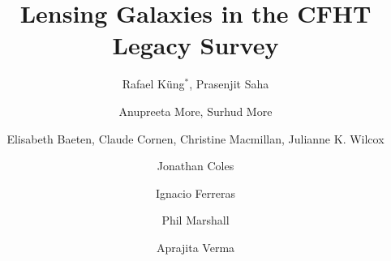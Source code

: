 \documentclass{ws-procs975x65}
\begin{document}
\title{Lensing Galaxies in the CFHT Legacy Survey}

\author{
  Rafael Küng$^*$, Prasenjit Saha
}
\address{
Physik-Institut, University of Zürich,\\
Winterthurerstrasse 190, 8057 Zürich, Switzerland\\
$^*$E-mail: rafael\_kueng@uzh.ch
}
\author{
  Anupreeta More, Surhud More
}
\address{
  Kavli Institute for the Physics and Mathematics of the Universe, University of Tokyo\\ 5-1-5 Kashiwanoha, Kashiwa-shi 277-8583, Japan
}

\author{
  Elisabeth Baeten, Claude Cornen, Christine Macmillan, Julianne K. Wilcox
}
\address{
  Zooniverse, c/o Astrophysics Department, University of Oxford\\
  Oxford OX1 3RH, UK
}

\author{
  Jonathan Coles
}
\address{
  Exascale Research Computing Lab, Campus Teratec,\\
  2 Rue de la Piquetterie, 91680 Bruyeres-le-Chatel, France
}

\author{Ignacio Ferreras}
\address{Mullard Space Science Laboratory, University College London, Holmbury St Mary, Dorking, Surrey RH5 6NT, UK}

\author{
  Phil Marshall
}
\address{
  Kavli Institute for Particle Astrophysics and Cosmology, Stanford University\\
  452 Lomita Mall, Stanford, CA 94035, USA
}

\author{
  Aprajita Verma
}
\address{
  Sub-department of Astrophysics, University of Oxford, Denys Wilkinson Building\\
  Keble Road, Oxford, OX1 3RH, UK
}





% 
% 
% 
\end{document}

